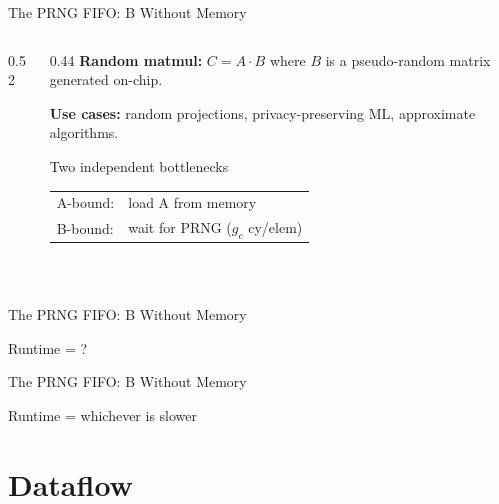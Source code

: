 \documentclass[aspectratio=169]{beamer}
\begin{document}
\begin{frame}{The PRNG FIFO: B Without Memory}
\begin{columns}[c]
\begin{column}{0.52\textwidth}
\begin{tikzpicture}
    \end{tikzpicture}
    \end{column}

    \begin{column}{0.44\textwidth}
      \textbf{Random matmul:} $C = A \cdot B$ where $B$ is a pseudo-random
      matrix generated on-chip.

      \smallskip
      \textbf{Use cases:} random projections, privacy-preserving ML,
      approximate algorithms.

      \smallskip
      \begin{block}{Two independent bottlenecks}
        \smallskip
        \begin{tabular}{@{}ll@{}}
          A-bound: & load A from memory \\[2pt]
          B-bound: & wait for PRNG ($g_c$ cy/elem) \\
        \end{tabular}\\[4pt]
      \end{block}
    \end{column}

  \end{columns}

\end{frame}

\begin{frame}{The PRNG FIFO: B Without Memory}

    \begin{center}
        \huge
        Runtime = ?
    \end{center}

\end{frame}

\begin{frame}{The PRNG FIFO: B Without Memory}

    \begin{center}
        \huge
        Runtime = whichever is slower
    \end{center}

\end{frame}

\section{Dataflow}
\end{document}
